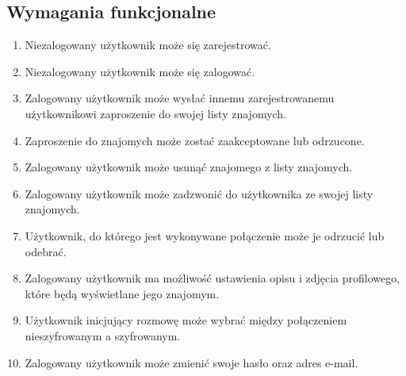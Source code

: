 \documentclass{article}
\begin{document}
  \subsection{Wymagania funkcjonalne}
  \begin{enumerate}
    \item Niezalogowany użytkownik może się zarejestrować.
    \item Niezalogowany użytkownik może się zalogować.
    \item Zalogowany użytkownik może wysłać innemu zarejestrowanemu użytkownikowi zaproszenie do swojej listy znajomych.
    \item Zaproszenie do znajomych może zostać zaakceptowane lub odrzucone.
    \item Zalogowany użytkownik może usunąć znajomego z listy znajomych.
    \item Zalogowany użytkownik może zadzwonić do użytkownika ze swojej listy znajomych.
    \item Użytkownik, do którego jest wykonywane połączenie może je odrzucić lub odebrać.
    \item Zalogowany użytkownik ma możliwość ustawienia opisu i zdjęcia profilowego, które będą wyświetlane jego znajomym.
    \item Użytkownik inicjujący rozmowę może wybrać między połączeniem nieszyfrowanym a szyfrowanym.
    \item Zalogowany użytkownik może zmienić swoje hasło oraz adres e-mail.
  \end{enumerate}
\end{document}
